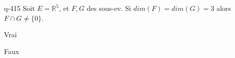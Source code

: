 \begin{truefalse}{q-415}
Soit $E=\mathbb R^5$, et $F,G$ des sous-ev. Si $dim(F)=dim(G)=3$ alors $F \cap G\neq\{0\}$.
\item* Vrai
\item Faux
\end{truefalse}

